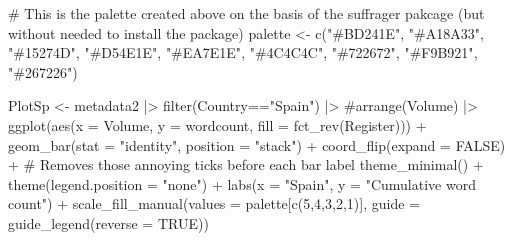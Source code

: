 \documentclass[
  letterpaper,
  DIV=11,
  numbers=noendperiod]{scrreprt}
\newenvironment{Shaded}{\begin{snugshade}}{\end{snugshade}}
\newcommand{\AttributeTok}[1]{\textcolor[rgb]{0.40,0.45,0.13}{#1}}
\newcommand{\CommentTok}[1]{\textcolor[rgb]{0.37,0.37,0.37}{#1}}
\newcommand{\ConstantTok}[1]{\textcolor[rgb]{0.56,0.35,0.01}{#1}}
\newcommand{\DecValTok}[1]{\textcolor[rgb]{0.68,0.00,0.00}{#1}}
\newcommand{\FunctionTok}[1]{\textcolor[rgb]{0.28,0.35,0.67}{#1}}
\newcommand{\NormalTok}[1]{\textcolor[rgb]{0.00,0.23,0.31}{#1}}
\newcommand{\OtherTok}[1]{\textcolor[rgb]{0.00,0.23,0.31}{#1}}
\newcommand{\SpecialCharTok}[1]{\textcolor[rgb]{0.37,0.37,0.37}{#1}}
\newcommand{\StringTok}[1]{\textcolor[rgb]{0.13,0.47,0.30}{#1}}
\begin{document}
\begin{Shaded}
\begin{Highlighting}[]
\CommentTok{\# This is the palette created above on the basis of the suffrager pakcage (but without needed to install the package)}
\NormalTok{palette }\OtherTok{\textless{}{-}} \FunctionTok{c}\NormalTok{(}\StringTok{"\#BD241E"}\NormalTok{, }\StringTok{"\#A18A33"}\NormalTok{, }\StringTok{"\#15274D"}\NormalTok{, }\StringTok{"\#D54E1E"}\NormalTok{, }\StringTok{"\#EA7E1E"}\NormalTok{, }\StringTok{"\#4C4C4C"}\NormalTok{, }\StringTok{"\#722672"}\NormalTok{, }\StringTok{"\#F9B921"}\NormalTok{, }\StringTok{"\#267226"}\NormalTok{)}

\NormalTok{PlotSp }\OtherTok{\textless{}{-}}\NormalTok{ metadata2 }\SpecialCharTok{|\textgreater{}}  
  \FunctionTok{filter}\NormalTok{(Country}\SpecialCharTok{==}\StringTok{"Spain"}\NormalTok{) }\SpecialCharTok{|\textgreater{}}  
  \CommentTok{\#arrange(Volume) |\textgreater{}  }
  \FunctionTok{ggplot}\NormalTok{(}\FunctionTok{aes}\NormalTok{(}\AttributeTok{x =}\NormalTok{ Volume, }\AttributeTok{y =}\NormalTok{ wordcount, }\AttributeTok{fill =} \FunctionTok{fct\_rev}\NormalTok{(Register))) }\SpecialCharTok{+} 
    \FunctionTok{geom\_bar}\NormalTok{(}\AttributeTok{stat =} \StringTok{"identity"}\NormalTok{, }\AttributeTok{position =} \StringTok{"stack"}\NormalTok{) }\SpecialCharTok{+}
    \FunctionTok{coord\_flip}\NormalTok{(}\AttributeTok{expand =} \ConstantTok{FALSE}\NormalTok{) }\SpecialCharTok{+} \CommentTok{\# Removes those annoying ticks before each bar label}
    \FunctionTok{theme\_minimal}\NormalTok{() }\SpecialCharTok{+} \FunctionTok{theme}\NormalTok{(}\AttributeTok{legend.position =} \StringTok{"none"}\NormalTok{) }\SpecialCharTok{+}
    \FunctionTok{labs}\NormalTok{(}\AttributeTok{x =} \StringTok{"Spain"}\NormalTok{, }\AttributeTok{y =} \StringTok{"Cumulative word count"}\NormalTok{) }\SpecialCharTok{+}
    \FunctionTok{scale\_fill\_manual}\NormalTok{(}\AttributeTok{values =}\NormalTok{ palette[}\FunctionTok{c}\NormalTok{(}\DecValTok{5}\NormalTok{,}\DecValTok{4}\NormalTok{,}\DecValTok{3}\NormalTok{,}\DecValTok{2}\NormalTok{,}\DecValTok{1}\NormalTok{)], }
                      \AttributeTok{guide =} \FunctionTok{guide\_legend}\NormalTok{(}\AttributeTok{reverse =} \ConstantTok{TRUE}\NormalTok{))}


\end{Highlighting}
\end{Shaded}
\end{document}
